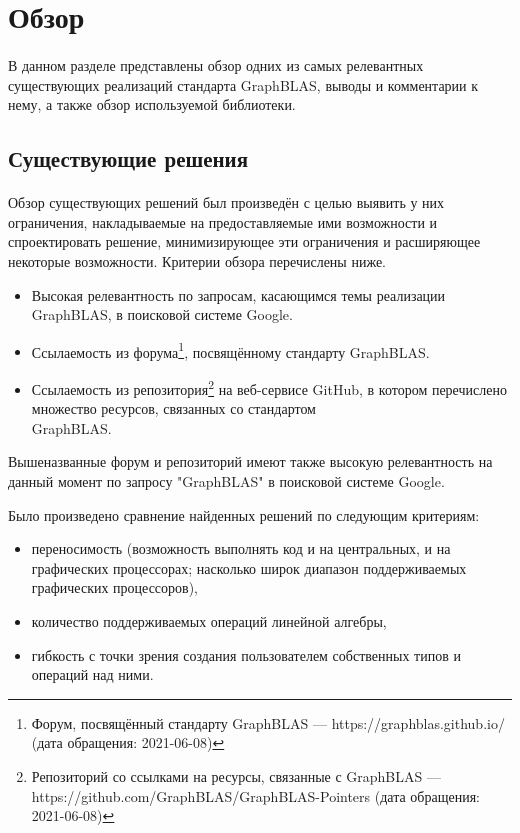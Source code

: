 \documentclass[14pt]{matmex-diploma-custom}
\begin{document}
\section{Обзор}
\paragraph{}В данном разделе представлены обзор одних из самых релевантных существующих реализаций стандарта GraphBLAS, выводы и комментарии к нему, а также обзор используемой библиотеки.

\subsection{Существующие решения}
\paragraph{} Обзор существующих решений был произведён с целью выявить у них ограничения, накладываемые на предоставляемые ими возможности и спроектировать решение, минимизирующее эти ограничения и расширяющее некоторые возможности. Критерии обзора перечислены ниже.
\begin{itemize}
    \item Высокая релевантность по запросам, касающимся темы реализации GraphBLAS, в поисковой системе Google.
    \item Ссылаемость из форума\footnote{Форум, посвящённый стандарту GraphBLAS --- https://graphblas.github.io/ (дата обращения: 2021-06-08)}, посвящённому стандарту GraphBLAS.
    \item Ссылаемость из репозитория\footnote{Репозиторий со ссылками на ресурсы, связанные с GraphBLAS --- https://github.com/GraphBLAS/GraphBLAS-Pointers (дата обращения: 2021-06-08)} на веб-сервисе GitHub, в котором перечислено множество ресурсов, связанных со стандартом\\ GraphBLAS.
\end{itemize}

Вышеназванные форум и репозиторий имеют также высокую релевантность на данный момент по запросу "GraphBLAS" в поисковой системе Google.

Было произведено сравнение найденных решений по следующим критериям:
\begin{itemize}
    \item переносимость (возможность выполнять код и на центральных, и на графических процессорах; насколько широк диапазон поддерживаемых графических процессоров),
    \item количество поддерживаемых операций линейной алгебры,
    \item гибкость с точки зрения создания пользователем собственных типов и операций над ними.
\end{itemize}
\end{document}
